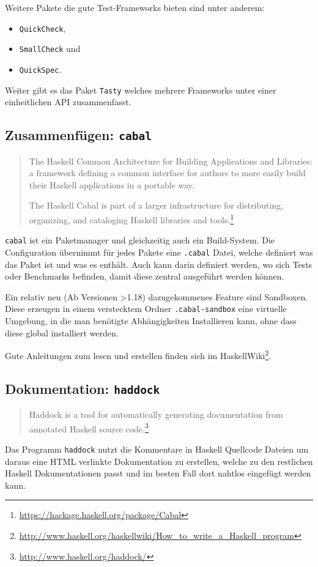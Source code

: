 Weitere Pakete die gute Test-Frameworks bieten sind unter anderem:
\begin{itemize}
  \item \texttt{QuickCheck},
  \item \texttt{SmallCheck} und
  \item \texttt{QuickSpec}.
\end{itemize}
Weiter gibt es das Paket \texttt{Tasty} welches mehrere Frameworks unter einer
einheitlichen API zusammenfasst.

\subsection{Zusammenfügen: \texttt{cabal}}
\begin{quote}
  The Haskell Common Architecture for Building Applications and Libraries: a
  framework defining a common interface for authors to more easily build their
  Haskell applications in a portable way.

  The Haskell Cabal is part of a larger infrastructure for distributing,
  organizing, and cataloging Haskell libraries and
  tools.\footnote{\url{https://hackage.haskell.org/package/Cabal}}
\end{quote}
\texttt{cabal} ist ein Paketmanager und gleichzeitig auch ein Build-System. Die
Configuration übernimmt für jedes Pakete eine \texttt{.cabal} Datei, welche
definiert was das Paket ist und was es enthält. Auch kann darin definiert
werden, wo sich Tests oder Benchmarks befinden, damit diese zentral ausgeführt
werden können.

Ein relativ neu (Ab Versionen >1.18) dazugekommenes Feature sind Sandboxen.
Diese erzeugen in einem verstecktem Ordner \texttt{.cabal-sandbox} eine
virtuelle Umgebung, in die man benötigte Abhängigkeiten Installieren kann, ohne
dass diese global installiert werden.

Gute Anleitungen zum lesen und erstellen finden sich im
HaskellWiki\footnote{\url{http://www.haskell.org/haskellwiki/How_to_write_a_Haskell_program}}.

\subsection{Dokumentation: \texttt{haddock}}
\begin{quote}
  Haddock is a tool for automatically generating documentation from annotated
  Haskell source code.\footnote{\url{http://www.haskell.org/haddock/}}
\end{quote}
Das Programm \texttt{haddock} nutzt die Kommentare in Haskell Quellcode Dateien
um daraus eine HTML verlinkte Dokumentation zu erstellen, welche zu den
restlichen Haskell Dokumentationen passt und im besten Fall dort nahtlos
eingefügt werden kann.

